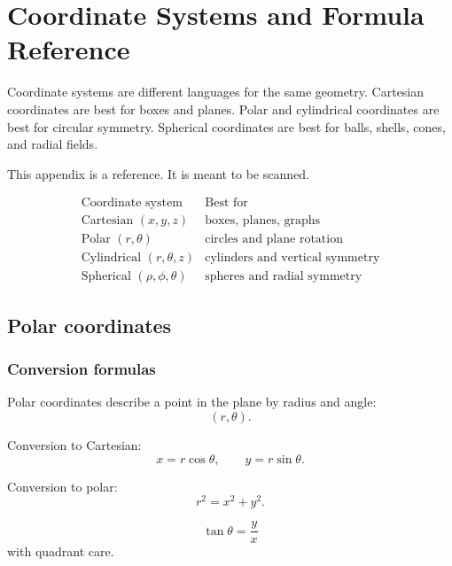
\chapter{Coordinate Systems and Formula Reference}
\label{app:coordinate-systems-reference}

Coordinate systems are different languages for the same geometry.  Cartesian coordinates
are best for boxes and planes.  Polar and cylindrical coordinates are best for circular
symmetry.  Spherical coordinates are best for balls, shells, cones, and radial fields.

This appendix is a reference.  It is meant to be scanned.

\[
\begin{array}{c|c}
\text{Coordinate system} & \text{Best for} \\ \hline
\text{Cartesian }(x,y,z) & \text{boxes, planes, graphs}\\[1mm]
\text{Polar }(r,\theta) & \text{circles and plane rotation}\\[1mm]
\text{Cylindrical }(r,\theta,z) & \text{cylinders and vertical symmetry}\\[1mm]
\text{Spherical }(\rho,\phi,\theta) & \text{spheres and radial symmetry}
\end{array}
\]

\section{Polar coordinates}
\label{app:D.1}

\subsection*{Conversion formulas}

Polar coordinates describe a point in the plane by radius and angle:
\[
\boxed{
    (r,\theta).
}
\]

Conversion to Cartesian:
\[
\boxed{
    x=r\cos\theta,
    \qquad
    y=r\sin\theta.
}
\]

Conversion to polar:
\[
\boxed{
    r^2=x^2+y^2.
}
\]

\[
\boxed{
    \tan\theta=\frac yx
}
\]
with quadrant care.

